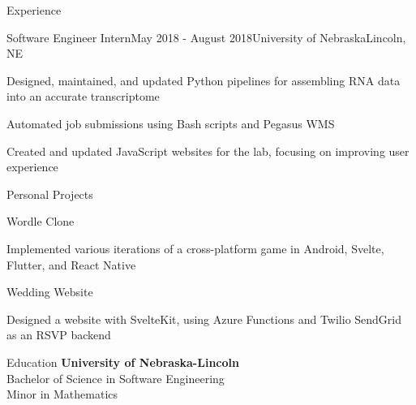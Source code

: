 \documentclass[
	10pt, %
]{article} %
\begin{document}
\begin{rSection}{Experience}
	\begin{rSubsection}{Software Engineer Intern}{May 2018 - August 2018}{University of Nebraska}{Lincoln, NE}
		\item Designed, maintained, and updated Python pipelines for assembling RNA data into an accurate transcriptome
		\item Automated job submissions using Bash scripts and Pegasus WMS
		\item Created and updated JavaScript websites for the lab, focusing on improving user experience
	\end{rSubsection}

\end{rSection}

\begin{rSection}{Personal Projects}

	\begin{rSubsection}{Wordle Clone}{}{}{}
		\item Implemented various iterations of a cross-platform game in Android, Svelte, Flutter, and React Native
	\end{rSubsection}

	\begin{rSubsection}{Wedding Website}{}{}{}
		\item Designed a website with SvelteKit, using Azure Functions and Twilio SendGrid as an RSVP backend
	\end{rSubsection}

\end{rSection}

\begin{rSection}{Education}
	\textbf{University of Nebraska-Lincoln} \\
	Bachelor of Science in Software Engineering \\
	Minor in Mathematics
\end{rSection}





\end{document}
